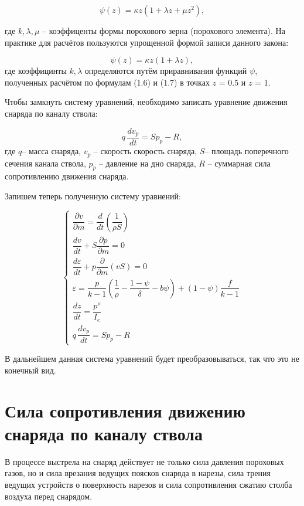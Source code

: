 \documentclass[14pt, a4paper]{report} %
\begin{document}
\begin{equation}
\psi(z) = \kappa z (1 + \lambda z + \mu z^2),
\end{equation}

где $k, \lambda, \mu$ -- коэффиценты формы порохового зерна (порохового элемента).
На практике для расчётов пользуются упрощенной формой записи данного закона:

\begin{equation}
\psi(z) = \kappa z (1 + \lambda z),
\end{equation}
где коэффицинты $k, \lambda$ определяются путём приравнивания функций $\psi$, полученных расчётом по формулам (1.6) и (1.7) в точках $z$ = 0.5 и $z$ = 1.

Чтобы замкнуть систему уравнений, необходимо записать уравнение движения снаряда по каналу ствола:

\begin{equation}
q \, \frac{d v_{p}}{d t} = S p_{p} - R,
\end{equation}
где $q$-- масса снаряда, $v_p$ -- скорость скорость снаряда, $S$-- площадь поперечного сечения канала ствола, $ p_{p}$ -- давление на дно снаряда, $R$ -- суммарная сила сопротивлению движения снаряда. 

Запишем теперь полученную систему уравнений: 

\[
\left\{
\begin{array}{l}
\dfrac{\partial v}{\partial m} = \dfrac{d}{dt}\left(\dfrac{1}{\rho S}\right) \\[1.5ex]
\dfrac{dv}{dt} + S\dfrac{\partial p}{\partial m} = 0 \\[1.5ex]
\dfrac{d\varepsilon}{dt} + p\dfrac{\partial}{\partial m}(vS) = 0 \\[1.5ex]
\varepsilon = \dfrac{p}{k - 1} \left( \dfrac{1}{\rho} - \dfrac{1 - \psi}{\delta} - b \psi \right) + (1 - \psi) \dfrac{f}{k - 1} \\[1.5ex]
\dfrac{dz}{dt} = \dfrac{p^\nu}{I_e} \\[1.5ex]
q \, \dfrac{d v_{p}}{d t} = S p_{p} - R
\end{array}
\right.
\]

В дальнейшем данная система уравнений будет преобразовываться, так что это не конечный вид.

\section{Сила сопротивления движению снаряда по каналу ствола}

В процессе выстрела на снаряд действует не только сила давления пороховых газов, но и сила врезания ведущих поясков снаряда в нарезы, сила трения ведущих устройств о поверхность нарезов и сила сопротивления сжатию столба воздуха перед снарядом. 
\end{document}
